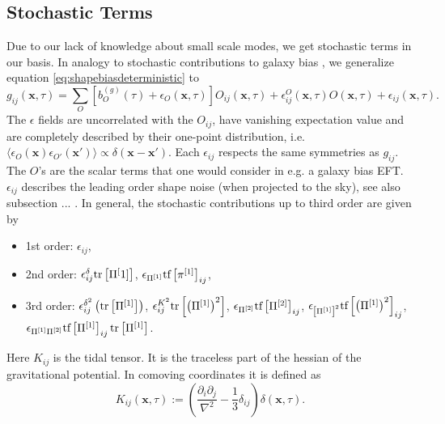 \documentclass[11pt]{article}
\DeclareRobustCommand{\tr}{\ifmmode\text{tr}\else d\fi}
\DeclareRobustCommand{\tf}{\ifmmode\text{tf}\else d\fi}
\newcommand{\br}[1]{\ensuremath{\left( #1 \right)}}
\newcommand{\sbr}[1]{\ensuremath{\left[ #1 \right]}}
\begin{document}
\subsection{Stochastic Terms}
Due to our lack of knowledge about small scale modes, we get stochastic terms in our basis. In analogy to stochastic contributions to galaxy bias \cite{Desjacques_2018}, we generalize equation \ref{eq:shapebiasdeterministic} to \cite{Vlah_2020}
\begin{equation}
    g_{ij}(\mathbf x, \tau) = \sum_{O}\sbr{b^{(g)}_{O}(\tau) + \epsilon_O(\mathbf x, \tau)} O_{ij}(\mathbf x, \tau) + \epsilon_{ij}^O(\mathbf x, \tau) O(\mathbf x, \tau) + \epsilon_{ij}(\mathbf x, \tau).
\end{equation}
The $\epsilon$ fields are uncorrelated with the $O_{ij}$, have vanishing expectation value and are completely described by their one-point distribution, i.e. $\langle \epsilon_O(\mathbf x) \epsilon_{O'}(\mathbf x') \rangle \propto \delta(\mathbf x - \mathbf x')$. %
Each $\epsilon_{ij}$ respects the same symmetries as $g_{ij}$. The $O$'s are the scalar terms that one would consider in e.g. a galaxy bias EFT. $\epsilon_{ij}$ describes the leading order shape noise (when projected to the sky), see also subsection ... .
In general, the stochastic contributions up to third order are given by 
\begin{itemize}
    \item[] 1st order: $\epsilon_{ij}$,
    \item[] 2nd order: $\epsilon_{ij}^\delta\tr\sbr{\Pi^[1]}$, $\epsilon_{\Pi^{[1]}}\tf\sbr{\pi^{[1]}}_{ij}$,
    \item[] 3rd order: $\epsilon_{ij}^{\delta^2}\br{\tr\sbr{\Pi^{[1]}}}$, $\epsilon_{ij}^{K^2}\tr\sbr{\br{\Pi^{[1]}}^2}$, $\epsilon_{\Pi^{[2]}}\tf\sbr{\Pi^{[2]}}_{ij}$, $\epsilon_{\sbr{\Pi^{[1]}}^2}\tf\sbr{\br{\Pi^{[1]}}^2}_{ij}$, \\ $\epsilon_{\Pi^{[1]}\Pi^{[2]}}\tf\sbr{\Pi^{[1]}}_{ij}\tr\sbr{\Pi^{[1]}}$.
\end{itemize}
Here $K_{ij}$ is the tidal tensor. It is the traceless part of the hessian of the gravitational potential. In comoving coordinates it is defined as
\begin{equation}
    K_{ij}(\mathbf x, \tau) := \br{\frac{\partial_i\partial_j}{\nabla^2}-\frac{1}{3}\delta_{ij}}\delta(\mathbf x, \tau).
\end{equation}
\end{document}
